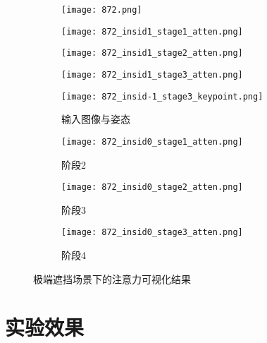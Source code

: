 \begin{figure}[h]
	\centering
	\begin{minipage}[t]{\linewidth}
		\centering
		\begin{subfigure}[t]{0.22\linewidth}
			\texttt{[image: 872.png]}
		\end{subfigure}
		\begin{subfigure}[t]{0.22\linewidth}
			\texttt{[image: 872\_insid1\_stage1\_atten.png]}
		\end{subfigure}
		\begin{subfigure}[t]{0.22\linewidth}
			\texttt{[image: 872\_insid1\_stage2\_atten.png]}
		\end{subfigure}
		\begin{subfigure}[t]{0.22\linewidth}
			\texttt{[image: 872\_insid1\_stage3\_atten.png]}
		\end{subfigure}
	\end{minipage}

	\vskip2pt
	\begin{minipage}{\linewidth}
		\centering
		\begin{subfigure}[t]{0.22\linewidth}
			\texttt{[image: 872\_insid-1\_stage3\_keypoint.png]}
			\caption{输入图像与姿态}
		\end{subfigure}
		\begin{subfigure}[t]{0.22\linewidth}
			\texttt{[image: 872\_insid0\_stage1\_atten.png]}
			\caption{阶段2}
		\end{subfigure}
		\begin{subfigure}[t]{0.22\linewidth}
			\texttt{[image: 872\_insid0\_stage2\_atten.png]}
			\caption{阶段3}
		\end{subfigure}
		\begin{subfigure}[t]{0.22\linewidth}
			\texttt{[image: 872\_insid0\_stage3\_atten.png]}
			\caption{阶段4}
		\end{subfigure}
	\end{minipage}
	\caption{极端遮挡场景下的注意力可视化结果}
	\label{fig:failcase}
\end{figure}



\section{实验效果}
\label{sec:demo}

